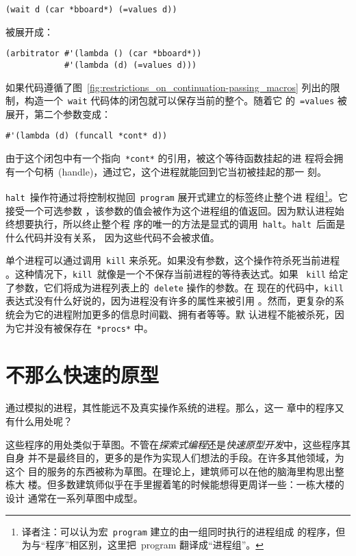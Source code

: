 \begin{lstlisting}
(wait d (car *bboard*) (=values d))
\end{lstlisting}
被展开成：
\begin{lstlisting}
(arbitrator #'(lambda () (car *bboard*))
            #'(lambda (d) (=values d)))
\end{lstlisting}
如果代码遵循了图~\ref{fig:restrictions_on_continuation-passing_macros} 列出的限
制，构造一个~\texttt{wait} 代码体的闭包就可以保存当前的整个\continuation{}。随着它
的~\texttt{=values} 被展开，第二个参数变成：
\begin{lstlisting}
#'(lambda (d) (funcall *cont* d))
\end{lstlisting}
由于这个闭包中有一个指向~\texttt{*cont*} 的引用，被这个等待函数挂起的进
程将会拥有一个句柄~(handle)，通过它，这个进程就能回到它当初被挂起的那一
刻。

\texttt{halt}~操作符通过将控制权抛回~\texttt{program} 展开式建立的标签终止整个进
程组\footnote{译者注：可以认为宏~\texttt{program} 建立的由一组同时执行的进程组成
的程序，但为与“程序”相区别，这里把~program 翻译成“进程组”。}。它接受一个可选参数
，该参数的值会被作为这个进程组的值返回。因为默认进程始终想要执行，所以终止整个程
序的唯一的方法是显式的调用~\texttt{halt}。\texttt{halt}~后面是什么代码并没有关系，
因为这些代码不会被求值。

单个进程可以通过调用~\texttt{kill} 来杀死。如果没有参数，这个操作符杀死当前进程
。这种情况下，\texttt{kill}~就像是一个不保存当前进程的等待表达式。如果
~\texttt{kill} 给定了参数，它们将成为进程列表上的~\texttt{delete} 操作的参数。在
现在的代码中，\texttt{kill} 表达式没有什么好说的，因为进程没有许多的属性来被引用
。然而，更复杂的系统会为它的进程附加更多的信息\pozhehao{}时间戳、拥有者等等。默
认进程不能被杀死，因为它并没有被保存在~\texttt{*procs*} 中。

\section{不那么快速的原型}

通过\continuation{}模拟的进程，其性能远不及真实操作系统的进程。那么，这一
章中的程序又有什么用处呢？

这些程序的用处类似于草图。不管在\emph{探索式编程}还是\emph{快速原型开发}中，这些程序其自身
并不是最终目的，更多的是作为实现人们想法的手段。在许多其他领域，为这个
目的服务的东西被称为草图。在理论上，建筑师可以在他的脑海里构思出整栋大
楼。但多数建筑师似乎在手里握着笔的时候能想得更周详一些：一栋大楼的设计
通常在一系列草图中成型。

